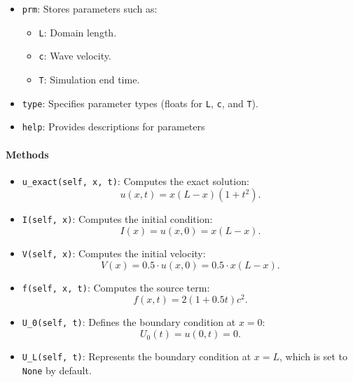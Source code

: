 \documentclass{article}
\begin{document}
			\begin{itemize}
				\item \texttt{prm}: Stores parameters such as:
				\begin{itemize}
					\item \texttt{L}: Domain length.
					\item \texttt{c}: Wave velocity.
					\item \texttt{T}: Simulation end time.
				\end{itemize}
				\item \texttt{type}: Specifies parameter types (floats for \texttt{L}, \texttt{c}, and \texttt{T}).
				\item \texttt{help}: Provides descriptions for parameters
			\end{itemize}
			
			\paragraph{Methods}
			\begin{itemize}
				\item \texttt{u\_exact(self, x, t)}: Computes the exact solution:
				\[
				u(x, t) = x(L - x)(1 + t^2).
				\]
				\item \texttt{I(self, x)}: Computes the initial condition:
				\[
				I(x) = u(x, 0) = x(L - x).
				\]
				\item \texttt{V(self, x)}: Computes the initial velocity:
				\[
				V(x) = 0.5 \cdot u(x, 0) = 0.5 \cdot x(L - x).
				\]
				\item \texttt{f(self, x, t)}: Computes the source term:
				\[
				f(x, t) = 2(1 + 0.5t)c^2.
				\]
				\item \texttt{U\_0(self, t)}: Defines the boundary condition at \(x = 0\):
				\[
				U_0(t) = u(0, t) = 0.
				\]
				\item \texttt{U\_L(self, t)}: Represents the boundary condition at \(x = L\), which is set to \texttt{None} by default.
			\end{itemize}
			
\end{document}
